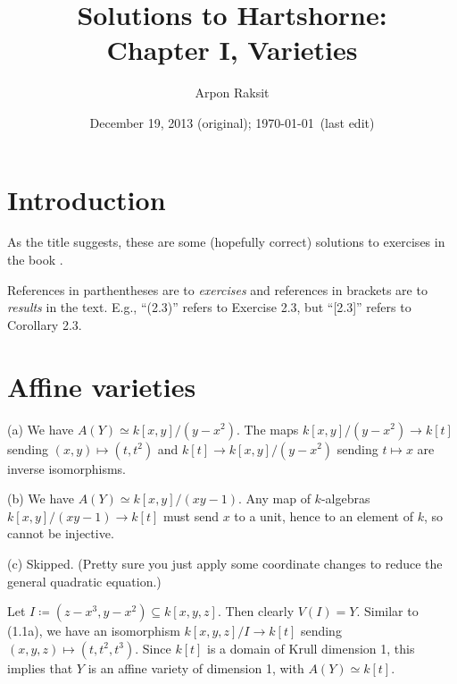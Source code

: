 



\title{Solutions to Hartshorne:\\Chapter I, Varieties}
\author{Arpon Raksit}
\date{December 19, 2013 (original); \today\ (last edit)}


\maketitle
\thispagestyle{fancy}

\section*{Introduction}

As the title suggests, these are some (hopefully correct) solutions to
exercises in the book \cite[Ch. I]{hartshorne}.

\begin{convention}
  References in parthentheses are to \emph{exercises} and references
  in brackets are to \emph{results} in the text. E.g., ``(2.3)''
  refers to Exercise 2.3, but ``[2.3]'' refers to Corollary 2.3.
\end{convention}


\section{Affine varieties}

\begin{nothing}
  (a) We have $A(Y) \simeq k[x,y]/(y-x^2)$. The maps $k[x,y]/(y-x^2)
  \to k[t]$ sending $(x,y) \mapsto (t,t^2)$ and $k[t] \to
  k[x,y]/(y-x^2)$ sending $t \mapsto x$ are inverse isomorphisms.

  \medskip\noindent
  (b) We have $A(Y) \simeq k[x,y]/(xy-1)$. Any map of $k$-algebras
  $k[x,y]/(xy-1) \to k[t]$ must send $x$ to a unit, hence to an
  element of $k$, so cannot be injective.

  \medskip\noindent
  (c) Skipped. (Pretty sure you just apply some coordinate changes to
  reduce the general quadratic equation.)
\end{nothing}

\begin{nothing}
  Let $I \coloneqq (z-x^3,y-x^2) \subseteq k[x,y,z]$. Then clearly
  $V(I) = Y$. Similar to (1.1a), we have an isomorphism $k[x,y,z]/I
  \to k[t]$ sending $(x,y,z) \mapsto (t,t^2,t^3)$. Since $k[t]$ is a
  domain of Krull dimension 1, this implies that $Y$ is an affine
  variety of dimension 1, with $A(Y) \simeq k[t]$.
\end{nothing}

